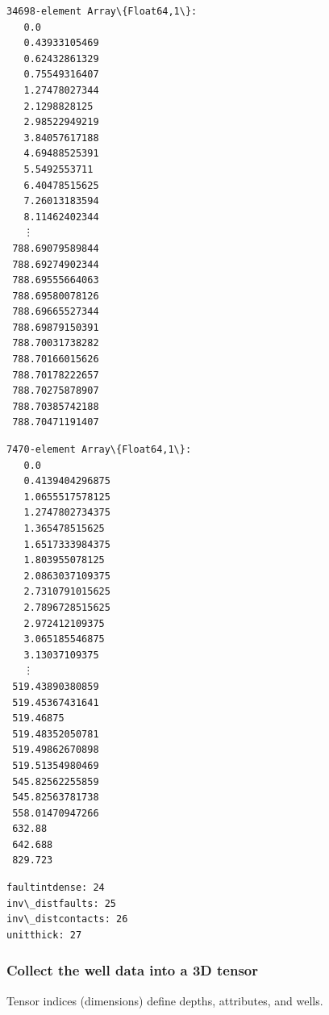 \documentclass[11pt]{article}
\begin{document}
    
    
    \begin{Verbatim}[commandchars=\\\{\}]
34698-element Array\{Float64,1\}:
   0.0
   0.43933105469
   0.62432861329
   0.75549316407
   1.27478027344
   2.1298828125
   2.98522949219
   3.84057617188
   4.69488525391
   5.5492553711
   6.40478515625
   7.26013183594
   8.11462402344
   ⋮
 788.69079589844
 788.69274902344
 788.69555664063
 788.69580078126
 788.69665527344
 788.69879150391
 788.70031738282
 788.70166015626
 788.70178222657
 788.70275878907
 788.70385742188
 788.70471191407
    \end{Verbatim}

    
    
    \begin{Verbatim}[commandchars=\\\{\}]
7470-element Array\{Float64,1\}:
   0.0
   0.4139404296875
   1.0655517578125
   1.2747802734375
   1.365478515625
   1.6517333984375
   1.803955078125
   2.0863037109375
   2.7310791015625
   2.7896728515625
   2.972412109375
   3.065185546875
   3.13037109375
   ⋮
 519.43890380859
 519.45367431641
 519.46875
 519.48352050781
 519.49862670898
 519.51354980469
 545.82562255859
 545.82563781738
 558.01470947266
 632.88
 642.688
 829.723
    \end{Verbatim}

    
    \begin{Verbatim}[commandchars=\\\{\}]
faultintdense: 24
inv\_distfaults: 25
inv\_distcontacts: 26
unitthick: 27
    \end{Verbatim}

    \hypertarget{collect-the-well-data-into-a-3d-tensor}{%
\subsubsection{Collect the well data into a 3D
tensor}\label{collect-the-well-data-into-a-3d-tensor}}

Tensor indices (dimensions) define depths, attributes, and wells.
\end{document}
